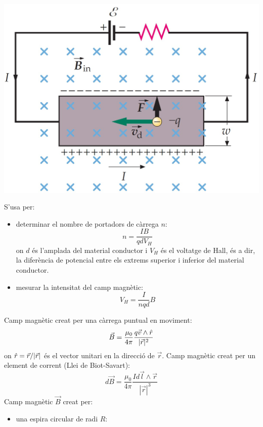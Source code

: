 \documentclass[../../../main.tex]{subfiles}
\begin{document}
\begin{multicols}{2}
\begin{minipage}{\linewidth}
    \end{minipage}
    \begin{minipage}{\linewidth}
        \centering
        \includegraphics[width=\linewidth]{Physics/1st/Electricity_and_magnetism/Images/hall-.jpg}
    \end{minipage}
    S'usa per:
    \begin{itemize}
        \item determinar el nombre de portadors de càrrega $n$: $$n=\frac{IB}{qdV_H}$$ {on $d$ és l'amplada del material conductor i $V_H$ és el voltatge de Hall, és a dir, la di\-fe\-rèn\-ci\-a de potencial entre els extrems superior i inferior del material conductor.}
        \item mesurar la intensitat del camp mag\-nè\-tic: $$V_H=\frac{I}{nqd}B$$
    \end{itemize}
    Camp magnètic creat per una càrrega puntual en moviment: $$\Vec{B}=\frac{\mu_0}{4\pi}\frac{q\Vec{v}\wedge\Hat{r}}{|\Vec{r}|^2}$$ {on $\Hat{r}=\Vec{r}/|\Vec{r}|$ és el vector unitari en la direcció de $\Vec{r}$.}\newline
    Camp magnètic creat per un element de corrent (Llei de Biot-Savart): $$d\Vec{B}=\frac{\mu_0}{4\pi}\frac{Id\Vec{l}\wedge\Vec{r}}{|\Vec{r}|^3}$$
    Camp magnètic $\Vec{B}$ creat per:
    \begin{itemize}
        \item una espira circular de radi $R$:
              \begin{itemize}

\end{itemize}
\end{itemize}
\end{multicols}
\end{document}
